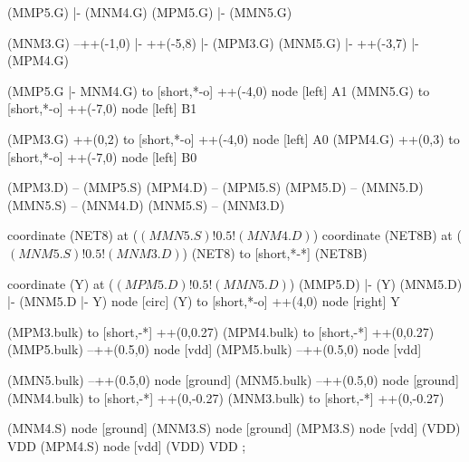 \begin{circuitikz}[american]
	(MMP5.G) |- (MNM4.G)
	(MPM5.G) |- (MMN5.G)
	
	(MNM3.G) --++(-1,0) |- ++(-5,8) |- (MPM3.G)
	(MNM5.G) |- ++(-3,7) |- (MPM4.G)
	
	(MMP5.G |- MNM4.G) to [short,*-o] ++(-4,0) node [left] {A1}
	(MMN5.G) to [short,*-o] ++(-7,0) node [left] {B1}
	
	(MPM3.G) ++(0,2) to [short,*-o] ++(-4,0) node [left] {A0}
	(MPM4.G) ++(0,3) to [short,*-o] ++(-7,0) node [left] {B0}
	
	(MPM3.D) -- (MMP5.S)
	(MPM4.D) -- (MPM5.S)
	(MPM5.D) -- (MMN5.D)
	(MMN5.S) -- (MNM4.D)
	(MNM5.S) -- (MNM3.D)
	
	coordinate (NET8) at ($(MMN5.S)!0.5!(MNM4.D)$)
	coordinate (NET8B) at ($(MNM5.S)!0.5!(MNM3.D)$)
	(NET8) to [short,*-*] (NET8B)
	
	coordinate (Y) at ($(MPM5.D)!0.5!(MMN5.D)$)
	(MMP5.D) |- (Y)
	(MNM5.D) |- (MNM5.D |- Y) node [circ] {}
	(Y) to [short,*-o] ++(4,0) node [right] {Y}
	
	(MPM3.bulk) to [short,-*] ++(0,0.27)
	(MPM4.bulk) to [short,-*] ++(0,0.27)
	(MMP5.bulk) --++(0.5,0) node [vdd]{}
	(MPM5.bulk) --++(0.5,0) node [vdd]{}
	
	(MMN5.bulk) --++(0.5,0) node [ground]{}
	(MNM5.bulk) --++(0.5,0) node [ground]{}
	(MNM4.bulk) to [short,-*] ++(0,-0.27)	
	(MNM3.bulk) to [short,-*] ++(0,-0.27)
	

	(MNM4.S) node [ground] {}
	(MNM3.S) node [ground] {}
	(MPM3.S) node [vdd] (VDD) {VDD}
	(MPM4.S) node [vdd] (VDD) {VDD}
;

\end{circuitikz}
